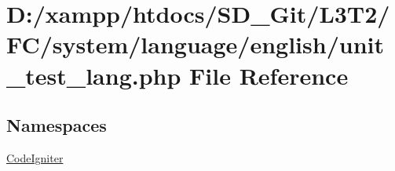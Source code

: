 \hypertarget{system_2language_2english_2unit__test__lang_8php}{}\section{D\+:/xampp/htdocs/\+S\+D\+\_\+\+Git/\+L3\+T2/\+F\+C/system/language/english/unit\+\_\+test\+\_\+lang.php File Reference}
\label{system_2language_2english_2unit__test__lang_8php}
\subsection*{Namespaces}
\begin{DoxyCompactItemize}
\item 
 \hyperlink{namespace_code_igniter}{Code\+Igniter}
\end{DoxyCompactItemize}
